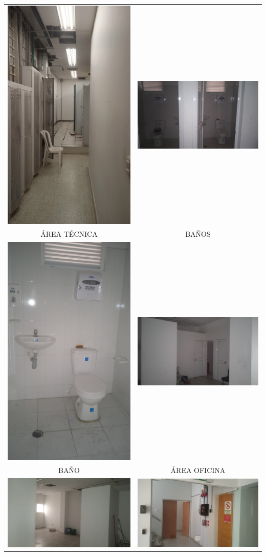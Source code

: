 \documentclass[12pt,a4paper,twoside]{article}
\begin{document}
\begin{tabular}{ c c }
	
	\includegraphics[width = 3 cm]{Imagenes/9} & \includegraphics[width = 7 cm]{Imagenes/7} \\
	ÁREA TÉCNICA  & BAÑOS\\
	\includegraphics[width = 3 cm]{Imagenes/8} & \includegraphics[width = 7 cm]{Imagenes/12} \\
	BAÑO & ÁREA OFICINA \\
	\includegraphics[width = 7 cm]{Imagenes/13} & \includegraphics[width = 7 cm]{Imagenes/14} \\

\end{tabular}
\end{document}

